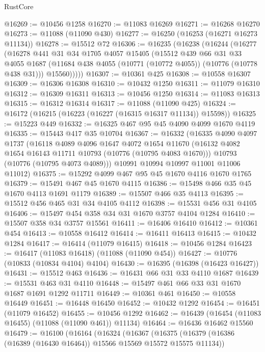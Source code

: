 \begin{lexlean}{RustCore}
\begin{coremodule}
@16269 := @10456 @1258
@16270 := @11083 @16269
@16271 := @16268 @16270
@16273 := @11088 (@11090 @430)
@16277 := @16250 (@16253 (@16271 @16273 @11134))
@16278 := @15512 @72
@16306 := @16235
    (@16238
      (@16244
        (@16277
          (@16278
            @441
            @31
            @34
            @1705
            @4057
            @15405
            (@15512
              @439
              @66
              @31
              @33
              @4055
              @1687
              (@11684 @438 @4055 (@10771 (@10772 @4055)) (@10776 (@10778 @438 @31)))
              @15560)))))
@16307 := @10361 @425
@16308 := @10558 @16307
@16309 := @16306 @16308
@16310 := @10432 @1250
@16311 := @11079 @16310
@16312 := @16309 @16311
@16313 := @10456 @1250
@16314 := @11083 @16313
@16315 := @16312 @16314
@16317 := @11088 (@11090 @425)
@16324 := @16172 (@16215 (@16223 (@16227 (@16315 @16317 @11134)) @15598))
@16325 := @15223 @449
@16332 := @16325 @467 @95 @45 @4090 @4099 @1670 @4119
@16335 := @15443 @417 @35 @10704
@16367 := @16332
    (@16335
      @4090
      @4097
      @1737
      (@16118
        @4089
        @4096
        @1647
        @4072
        @1654
        @11670
        (@16132 @4082 @1654 @16143 @11711 @10793 (@10776 (@10795 @4083 @1670)))
        @10793
        (@10776 (@10795 @4073 @4089)))
      @10991
      @10994
      @10997
      @11001
      @11006
      @11012)
@16375 := @15292 @4099 @467 @95 @45 @1670 @4116 @1670 @1765
@16379 := @15491 @467 @45 @1670 @4115
@16386 := @15498 @466 @35 @45 @1670 @4113 @1691 @1179
@16389 := @15507 @466 @35 @4113
@16395 := @15512 @456 @465 @31 @34 @4105 @4112
@16398 := @15531 @456 @31 @4105
@16406 := @15497 @454 @358 @34 @31 @1670 @3757 @4104 @1284
@16410 := @15507 @358 @34 @3757 @15561
@16411 := @16406 @16410
@16412 := @10361 @454
@16413 := @10558 @16412
@16414 := @16411 @16413
@16415 := @10432 @1284
@16417 := @16414 (@11079 @16415)
@16418 := @10456 @1284
@16423 := @16417 (@11083 @16418) (@11088 (@11090 @454))
@16427 := @10776 (@10833 (@10834 @4104) @4104)
@16430 := @16395 (@16398 (@16423 @16427))
@16431 := @15512 @463
@16436 := @16431 @66 @31 @33 @4110 @1687
@16439 := @15531 @463 @31 @4110
@16448 := @15497 @461 @66 @33 @31 @1670 @1687 @1691 @1292 @11711
@16449 := @10361 @461
@16450 := @10558 @16449
@16451 := @16448 @16450
@16452 := @10432 @1292
@16454 := @16451 (@11079 @16452)
@16455 := @10456 @1292
@16462 := @16439 (@16454 (@11083 @16455) (@11088 (@11090 @461)) @11134)
@16464 := @16436 @16462 @15560
@16479 := @16100
    (@16164
      (@16324
        (@16367
          (@16375
            (@16379 (@16386 (@16389 (@16430 @16464)) @15566 @15569 @15572 @15575 @11134))

\end{coremodule}
\end{lexlean}
